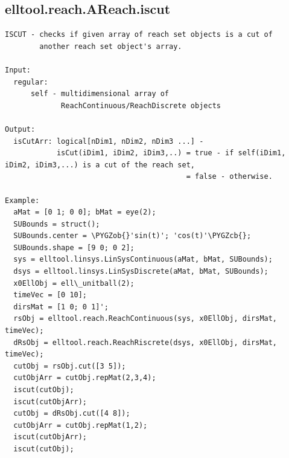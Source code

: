 \documentclass[letterpaper,10pt,english]{sphinxmanual}
\def\PYGZob{\char`\{}
\def\PYGZcb{\char`\}}
\begin{document}
\subsection{elltool.reach.AReach.iscut}
\label{chap_functions:elltool-reach-areach-iscut}
\begin{Verbatim}[commandchars=\\\{\}]
ISCUT - checks if given array of reach set objects is a cut of
        another reach set object's array.

Input:
  regular:
      self - multidimensional array of
             ReachContinuous/ReachDiscrete objects

Output:
  isCutArr: logical[nDim1, nDim2, nDim3 ...] -
            isCut(iDim1, iDim2, iDim3,..) = true - if self(iDim1, iDim2, iDim3,...) is a cut of the reach set,
                                          = false - otherwise.

Example:
  aMat = [0 1; 0 0]; bMat = eye(2);
  SUBounds = struct();
  SUBounds.center = \PYGZob{}'sin(t)'; 'cos(t)'\PYGZcb{};
  SUBounds.shape = [9 0; 0 2];
  sys = elltool.linsys.LinSysContinuous(aMat, bMat, SUBounds);
  dsys = elltool.linsys.LinSysDiscrete(aMat, bMat, SUBounds);
  x0EllObj = ell\_unitball(2);
  timeVec = [0 10];
  dirsMat = [1 0; 0 1]';
  rsObj = elltool.reach.ReachContinuous(sys, x0EllObj, dirsMat, timeVec);
  dRsObj = elltool.reach.ReachRiscrete(dsys, x0EllObj, dirsMat, timeVec);
  cutObj = rsObj.cut([3 5]);
  cutObjArr = cutObj.repMat(2,3,4);
  iscut(cutObj);
  iscut(cutObjArr);
  cutObj = dRsObj.cut([4 8]);
  cutObjArr = cutObj.repMat(1,2);
  iscut(cutObjArr);
  iscut(cutObj);
\end{Verbatim}
\end{document}
